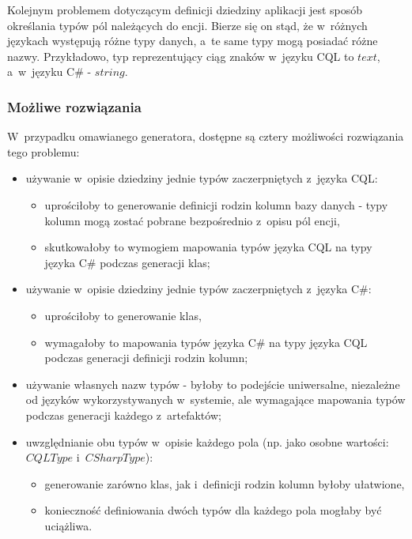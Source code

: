 Kolejnym problemem dotyczącym definicji dziedziny aplikacji jest sposób określania typów pól należących do encji.
Bierze się on stąd, że w~różnych językach występują różne typy danych, a~te same typy mogą posiadać różne nazwy.
Przykładowo, typ reprezentujący ciąg znaków w~języku CQL to $text$, a~w~języku C\# - $string$.

\subsubsection{Możliwe rozwiązania}

W~przypadku omawianego generatora, dostępne są cztery możliwości rozwiązania tego problemu:

\begin{itemize}
 \item używanie w~opisie dziedziny jednie typów zaczerpniętych z~języka CQL:
  \begin{itemize}
   \item uprościłoby to generowanie definicji rodzin kolumn bazy danych - typy kolumn mogą zostać pobrane bezpośrednio z~opisu pól encji,
   \item skutkowałoby to wymogiem mapowania typów języka CQL na typy języka C\# podczas generacji klas;
  \end{itemize}
 \item używanie w~opisie dziedziny jednie typów zaczerpniętych z~języka C\#:
  \begin{itemize}
   \item uprościłoby to generowanie klas,
   \item wymagałoby to mapowania typów języka C\# na typy języka CQL podczas generacji definicji rodzin kolumn;
  \end{itemize}
 \item używanie własnych nazw typów - byłoby to podejście uniwersalne, niezależne od języków wykorzystywanych w~systemie, ale wymagające mapowania typów podczas generacji każdego z~artefaktów;
 \item uwzględnianie obu typów w~opisie każdego pola (np. jako osobne wartości: $CQLType$ i~$CSharpType$):
  \begin{itemize}
   \item generowanie zarówno klas, jak i~definicji rodzin kolumn byłoby ułatwione,
   \item konieczność definiowania dwóch typów dla każdego pola mogłaby być uciążliwa.
  \end{itemize}
\end{itemize}

